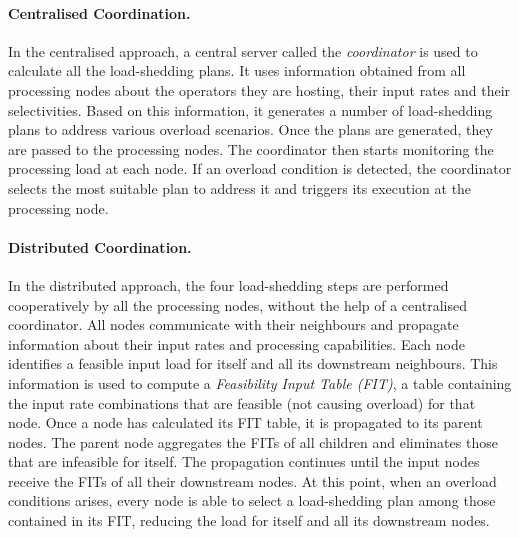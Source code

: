 \paragraph{Centralised Coordination.} In the centralised approach, a central server called the
\emph{coordinator} is used to calculate all the \mbox{load-shedding} plans. It uses information obtained from all processing nodes
about the operators they are hosting, their input rates and their selectivities. Based on this
information, it generates a number of \mbox{load-shedding} plans to address various overload scenarios.
Once the plans are generated, they are passed to the processing nodes. The
coordinator then starts monitoring the processing load at each node. If an overload condition is
detected, the coordinator selects the most suitable plan to address it and triggers its execution at the
processing node.

\paragraph{Distributed Coordination.} In the distributed approach, the four \mbox{load-shedding} steps
are performed cooperatively by all the processing nodes, without the help of a centralised coordinator. All nodes
communicate with their neighbours and propagate information about their input rates and processing
capabilities. Each node identifies a feasible input load for itself and all its downstream neighbours.
This information is used to compute a \emph{Feasibility Input Table (FIT)}, a table containing
the input rate combinations that are feasible (\ie not causing overload) for that node.
Once a node has calculated its FIT table, it is propagated to its parent nodes. The parent node
aggregates the FITs of all children and eliminates those that are infeasible for itself. The propagation
continues until the input nodes receive the FITs of all their downstream nodes. At this point, when an
overload conditions arises, every node is able to select a \mbox{load-shedding} plan among those
contained in its FIT, reducing the load for itself and all its downstream nodes.
% 
% 			
